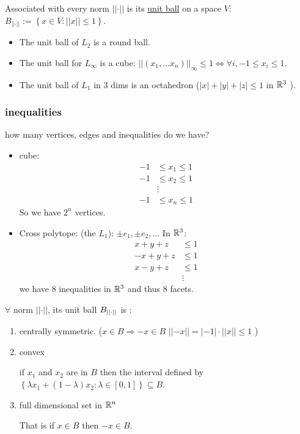 Associated with every norm $\left|\left|\cdot\right|\right|$ is its
\uline{unit ball} on a space $V$: $B_{\left|\left|\cdot\right|\right|}:=\left\{ x\in V:\left|\left|x\right|\right|\le1\right\} $.
\begin{itemize}
\item The unit ball of $L_{2}$ is a round ball. 
\item The unit ball for $L_{\infty}$ is a cube: $\left|\left|\left(x_{1},\dots x_{n}\right)\right|\right|_{\infty}\le1\iff\forall i,-1\le x_{i}\le1$.
\item The unit ball of $L_{1}$ in 3 dims is an octahedron ($\left|x\right|+\left|y\right|+\left|z\right|\le1$
in $\mathbb{R}^{3}$ ).
\end{itemize}

\subsubsection{inequalities}

how many vertices, edges and inequalities do we have?
\begin{itemize}
\item cube: 
\begin{align*}
-1 & \le x_{1}\le1\\
-1 & \le x_{2}\le1\\
 & \vdots\\
-1 & \le x_{n}\le1
\end{align*}
 So we have $2^{n}$ vertices.
\item Cross polytope: (the $L_{1}$): $\pm e_{1},\pm e_{2},\dots$ In $\mathbb{R}^{3}$:
\begin{align*}
x+y+z & \le1\\
-x+y+z & \le1\\
x-y+z & \le1\\
 & \vdots
\end{align*}
 we have 8 inequalities in $\mathbb{R}^{3}$ and thus $8$ facets.
\end{itemize}
\begin{fact}
$\forall$ norm $\left|\left|\cdot\right|\right|$, its unit ball
$B_{\left|\left|\cdot\right|\right|_{}}$ is :
\begin{enumerate}
\item centrally symmetric. ($x\in B\Rightarrow-x\in B$ $\left|\left|-x\right|\right|=\left|-1\right|\cdot\left|\left|x\right|\right|\le1$
)
\item convex %
\begin{insight}
if $x_{1}$ and $x_{2}$ are in $B$ then the interval defined by
$\left\{ \lambda x_{1}+\left(1-\lambda\right)x_{2}:\lambda\in\left[0,1\right]\right\} \subseteq B$.%
\end{insight}
\item full dimensional set in $\mathbb{R}^{n}$ %
\begin{insight}
That is if $x\in B$ then $-x\in B$.%
\end{insight}
\end{enumerate}
\end{fact}

